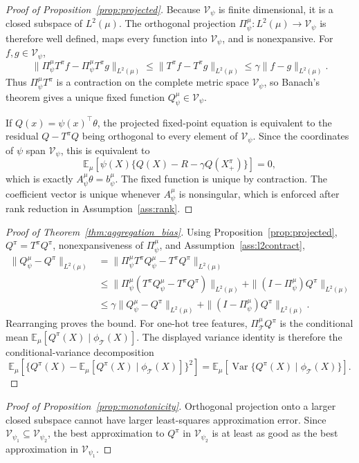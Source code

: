 \documentclass{article}
\newcommand{\E}{\mathbb{E}}
\newcommand{\cT}{\mathcal T}
\newcommand{\cV}{\mathcal V}
\newcommand{\proj}{\Pi}
\theoremstyle{plain}
\theoremstyle{definition}
\theoremstyle{remark}
\begin{document}
\begin{proof}[Proof of Proposition~\ref{prop:projected}]
Because \(\cV_\psi\) is finite dimensional, it is a closed subspace of
\(L^2(\mu)\). The orthogonal projection
\(\proj^\mu_\psi:L^2(\mu)\to\cV_\psi\) is therefore well defined,
maps every function into \(\cV_\psi\), and is nonexpansive. For
\(f,g\in\cV_\psi\),
\[
  \|\proj^\mu_\psi T^\pi f-\proj^\mu_\psi T^\pi g\|_{L^2(\mu)}
  \le
  \|T^\pi f-T^\pi g\|_{L^2(\mu)}
  \le
  \gamma\|f-g\|_{L^2(\mu)}.
\]
Thus \(\proj^\mu_\psi T^\pi\) is a contraction on the complete metric space
\(\cV_\psi\), so Banach's theorem gives a unique fixed function
\(Q^\mu_\psi\in\cV_\psi\).

If \(Q(x)=\psi(x)^\top\theta\), the projected fixed-point equation is
equivalent to the residual \(Q-T^\pi Q\) being orthogonal to every element of
\(\cV_\psi\). Since the coordinates of \(\psi\) span \(\cV_\psi\), this is
equivalent to
\[
  \E_\mu[\psi(X)\{Q(X)-R-\gamma Q(X^\pi_+)\}]=0,
\]
which is exactly \(A^\mu_\psi\theta=b^\mu_\psi\). The fixed function is unique
by contraction. The coefficient vector is unique whenever
\(A^\mu_\psi\) is nonsingular, which is enforced after rank reduction in
Assumption~\ref{ass:rank}.
\end{proof}

\begin{proof}[Proof of Theorem~\ref{thm:aggregation_bias}]
Using Proposition~\ref{prop:projected}, \(Q^\pi=T^\pi Q^\pi\), nonexpansiveness
of \(\proj^\mu_\psi\), and Assumption~\ref{ass:l2contract},
\[
  \begin{aligned}
  \|Q^\mu_\psi-Q^\pi\|_{L^2(\mu)}
  &=
  \|\proj^\mu_\psi T^\pi Q^\mu_\psi-T^\pi Q^\pi\|_{L^2(\mu)}\\
  &\le
  \|\proj^\mu_\psi(T^\pi Q^\mu_\psi-T^\pi Q^\pi)\|_{L^2(\mu)}
  +
  \|(I-\proj^\mu_\psi)Q^\pi\|_{L^2(\mu)}\\
  &\le
  \gamma\|Q^\mu_\psi-Q^\pi\|_{L^2(\mu)}
  +
  \|(I-\proj^\mu_\psi)Q^\pi\|_{L^2(\mu)}.
  \end{aligned}
\]
Rearranging proves the bound.
For one-hot tree features, \(\proj^\mu_{\cT}Q^\pi\) is the conditional mean
\(\E_\mu[Q^\pi(X)\mid \phi_{\cT}(X)]\). The displayed variance identity is
therefore the conditional-variance decomposition
\[
  \E_\mu\!\left[
    \{Q^\pi(X)-\E_\mu[Q^\pi(X)\mid \phi_{\cT}(X)]\}^2
  \right]
  =
  \E_\mu[\operatorname{Var}\{Q^\pi(X)\mid \phi_{\cT}(X)\}].
\]
\end{proof}

\begin{proof}[Proof of Proposition~\ref{prop:monotonicity}]
Orthogonal projection onto a larger closed subspace cannot have larger
least-squares approximation error. Since \(\cV_{\psi_1}\subseteq\cV_{\psi_2}\),
the best approximation to \(Q^\pi\) in \(\cV_{\psi_2}\) is at least as good as
the best approximation in \(\cV_{\psi_1}\).
\end{proof}
\end{document}
